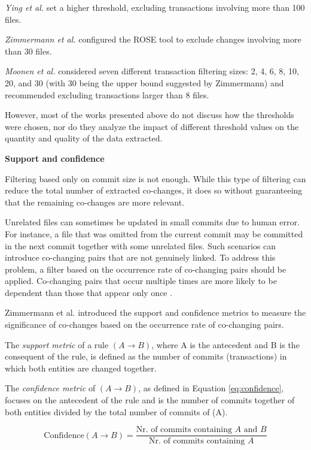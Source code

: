 \textit{Ying et al.} \cite{Ying-co-change} set a higher threshold, excluding transactions involving more than 100 files.

\textit{Zimmermann et al.} \cite{Zimmermann:2004:MVH:998675.999460} configured the ROSE tool to exclude changes involving more than 30 files.

\textit{Moonen et al.} \cite{Moonen-commit} considered seven different transaction filtering sizes: 2, 4, 6, 8, 10, 20, and 30 (with 30 being the upper bound suggested by Zimmermann) and recommended excluding transactions larger than 8 files.

However, most of the works presented above do not discuss how the thresholds were chosen, nor do they analyze the impact of different threshold values on the quantity and quality of the data extracted.


\textbf{Support and confidence}

Filtering based only on commit size is not enough. While this type of filtering can reduce the total number of extracted co-changes, it does so without guaranteeing that the remaining co-changes are more relevant.

Unrelated files can sometimes be updated in small commits due to human error. For instance, a file that was omitted from the current commit may be committed in the next commit together with some unrelated files. Such scenarios can introduce co-changing pairs that are not genuinely linked. To address this problem, a filter based on the occurrence rate of co-changing pairs should be applied. Co-changing pairs that occur multiple times are more likely to be dependent than those that appear only once \cite{b4}.

Zimmermann et al. \cite{Zimmermann:2004:MVH:998675.999460} introduced the support and confidence metrics to measure the significance of co-changes based on the occurrence rate of co-changing pairs.

The \textit{support metric} of a rule $(A \rightarrow B)$, where A is the antecedent and B is the consequent of the rule, is defined as the number of commits (transactions) in which both entities are changed together.

The \textit{confidence metric} of $(A \rightarrow B)$, as defined in Equation \eqref{eq:confidence}, focuses on the antecedent of the rule and is the number of commits together of both entities divided by the total number of commits of (A).

\begin{equation}
\text{Confidence}(A \rightarrow B) = \frac{\text{Nr. of commits containing } A \text{ and } B}{\text{Nr. of commits containing } A}
\label{eq:confidence}
\end{equation}



